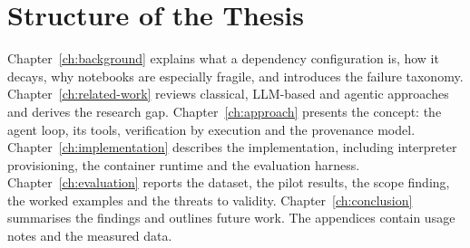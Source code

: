 \section{Structure of the Thesis}\label{sec:structure}

Chapter~\ref{ch:background} explains what a dependency configuration is, how it decays, why notebooks are especially fragile, and introduces the failure taxonomy. Chapter~\ref{ch:related-work} reviews classical, \ac{LLM}-based and agentic approaches and derives the research gap. Chapter~\ref{ch:approach} presents the concept: the agent loop, its tools, verification by execution and the provenance model. Chapter~\ref{ch:implementation} describes the implementation, including interpreter provisioning, the container runtime and the evaluation harness. Chapter~\ref{ch:evaluation} reports the dataset, the pilot results, the scope finding, the worked examples and the threats to validity. Chapter~\ref{ch:conclusion} summarises the findings and outlines future work. The appendices contain usage notes and the measured data.
